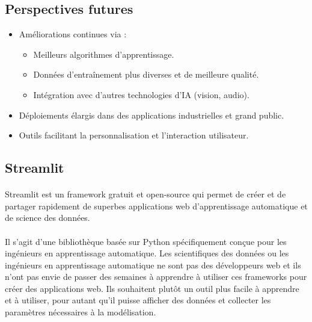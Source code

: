 \subsection{Perspectives futures}
\begin{itemize}
    \item Améliorations continues via :
    \begin{itemize}
        \item Meilleurs algorithmes d’apprentissage.
        \item Données d’entraînement plus diverses et de meilleure qualité.
        \item Intégration avec d’autres technologies d’IA (vision, audio).
    \end{itemize}
    \item Déploiements élargis dans des applications industrielles et grand public.
    \item Outils facilitant la personnalisation et l’interaction utilisateur.
\end{itemize}

\subsection{Streamlit}
\paragraph{}
Streamlit est un framework gratuit et open-source qui permet de créer et de partager rapidement de superbes applications web d'apprentissage automatique et de science des données.
\paragraph{}
Il s'agit d'une bibliothèque basée sur Python spécifiquement conçue pour les ingénieurs en apprentissage automatique. Les scientifiques des données ou les ingénieurs en apprentissage automatique ne sont pas des développeurs web et ils n'ont pas envie de passer des semaines à apprendre à utiliser ces frameworks pour créer des applications web. Ils souhaitent plutôt un outil plus facile à apprendre et à utiliser, pour autant qu'il puisse afficher des données et collecter les paramètres nécessaires à la modélisation.
